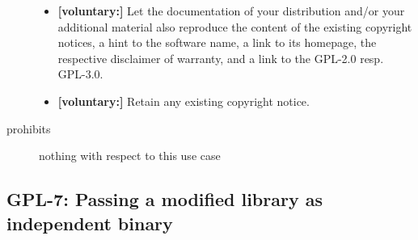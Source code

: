 \begin{description}
\begin{itemize}
  \item \textbf{[voluntary:]} Let the documentation of your distribution and/or
  your additional material also reproduce the content of the existing
  copyright notices, a hint to the software name, a link to its homepage,
  the respective disclaimer of warranty, and a link to the GPL-2.0 resp.
  GPL-3.0.
  
  \item \textbf{[voluntary:]} Retain any existing copyright notice. 

\end{itemize}

\item[prohibits] nothing with respect to this use case

\end{description}


\subsection{GPL-7: Passing a modified library as independent binary}

